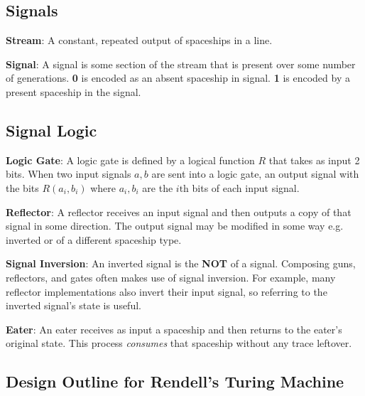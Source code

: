 \documentclass{article}
\begin{document}
\subsection{Signals}
\noindent\textbf{Stream}: A constant, repeated output of spaceships in a line.

\vspace{1em}

\noindent\textbf{Signal}: A signal is some section of the stream that is present over some number of generations. \textbf{0} is encoded as an absent spaceship in signal. \textbf{1} is encoded by a present spaceship in the signal.

\vspace{1em}
\subsection{Signal Logic}
\noindent\textbf{Logic Gate}: A logic gate is defined by a logical function $  R  $ that takes as input 2 bits. When two input signals $  a, b  $ are sent into a logic gate, an output signal with the bits $  R(a_i, b_i)  $ where $  a_i, b_i  $ are the $  i\text{th}  $ bits of each input signal.

\vspace{1em}

\noindent\textbf{Reflector}: A reflector receives an input signal and then outputs a copy of that signal in some direction. The output signal may be modified in some way e.g. inverted or of a different spaceship type.

\vspace{1em}

\noindent\textbf{Signal Inversion}: An inverted signal is the \textbf{NOT} of a signal. Composing guns, reflectors, and gates often makes use of signal inversion. For example, many reflector implementations also invert their input signal, so referring to the inverted signal's state is useful.

\vspace{1em}

\noindent\textbf{Eater}: An eater receives as input a spaceship and then returns to the eater's original state. This process \textit{consumes} that spaceship without any trace leftover.

\vspace{1em}
\subsection{Design Outline for Rendell's Turing Machine}
\end{document}
